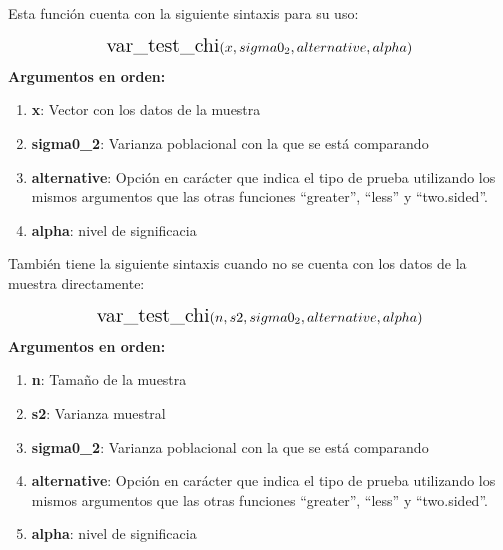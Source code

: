 \documentclass[
  spanish,
  letterpaper,
]{book}
\newenvironment{Shaded}{\begin{snugshade}}{\end{snugshade}}
\newcommand{\DecValTok}[1]{\textcolor[rgb]{0.68,0.00,0.00}{#1}}
\newcommand{\FunctionTok}[1]{\textcolor[rgb]{0.28,0.35,0.67}{#1}}
\newcommand{\NormalTok}[1]{\textcolor[rgb]{0.00,0.23,0.31}{#1}}
\newcommand{\SpecialCharTok}[1]{\textcolor[rgb]{0.37,0.37,0.37}{#1}}
\newcommand{\StringTok}[1]{\textcolor[rgb]{0.13,0.47,0.30}{#1}}
\begin{document}
\begin{Shaded}
\end{Shaded}

Esta función cuenta con la siguiente sintaxis para su uso:

\[ \Large \text{var\_test\_chi}(x, sigma0_2, alternative, alpha) \]
\textbf{Argumentos en orden:}

\begin{enumerate}
\def\labelenumi{\arabic{enumi}.}
\item
  \textbf{x}: Vector con los datos de la muestra
\item
  \textbf{sigma0\_2}: Varianza poblacional con la que se está comparando
\item
  \textbf{alternative}: Opción en carácter que indica el tipo de prueba
  utilizando los mismos argumentos que las otras funciones ``greater'',
  ``less'' y ``two.sided''.
\item
  \textbf{alpha}: nivel de significacia
\end{enumerate}

También tiene la siguiente sintaxis cuando no se cuenta con los datos de
la muestra directamente:

\[ \Large \text{var\_test\_chi}(n, s2, sigma0_2, alternative, alpha) \]
\textbf{Argumentos en orden:}

\begin{enumerate}
\def\labelenumi{\arabic{enumi}.}
\item
  \textbf{n}: Tamaño de la muestra
\item
  \textbf{s2}: Varianza muestral
\item
  \textbf{sigma0\_2}: Varianza poblacional con la que se está comparando
\item
  \textbf{alternative}: Opción en carácter que indica el tipo de prueba
  utilizando los mismos argumentos que las otras funciones ``greater'',
  ``less'' y ``two.sided''.
\item
  \textbf{alpha}: nivel de significacia
\end{enumerate}
\end{document}
